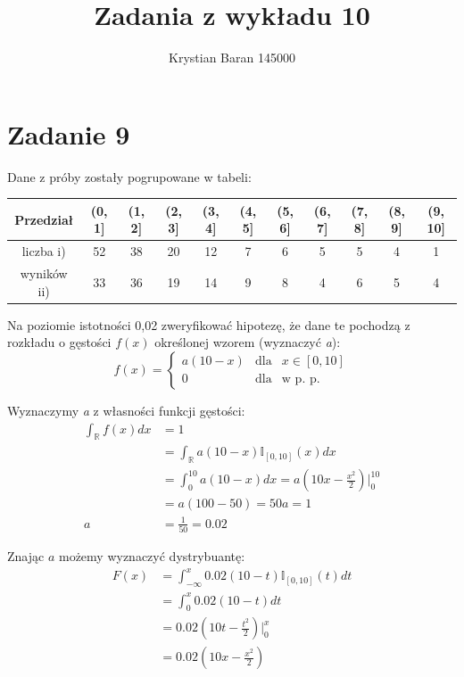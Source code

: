 \documentclass{article}
\author{Krystian Baran 145000}
\title{Zadania z wykładu 10}
\begin{document}
\maketitle
\newpage

\tableofcontents
\newpage

\section{Zadanie 9}
Dane z próby zostały pogrupowane w tabeli:
\begin{center} \begin{tabular}{|c|c|c|c|c|c|c|c|c|c|c|} \hline
Przedział & (0, 1] & (1, 2] & (2, 3] & (3, 4] & (4, 5] & (5, 6] & (6, 7] & (7, 8] & (8, 9] & (9, 10] \\ \hline
liczba i) &
52 & 38 & 20 & 12 & 7 & 6 & 5 & 5 & 4 & 1 \\ \cline{2-11}
wyników ii) & 33 & 36 & 19 & 14 & 9 & 8 & 4 & 6 & 5 & 4 \\ \hline
\end{tabular} \end{center}
Na poziomie istotności 0,02 zweryfikować hipotezę, że dane te
pochodzą z rozkładu o gęstości $f(x)$ określonej wzorem (wyznaczyć \textit{a}):
\[ f(x) = \left\{ \begin{array}{ccc} 
a(10 - x) & \text{dla} & x \in [0,10] \\
0 & \text{dla} & \text{w p. p.} 
\end{array} \right. \]

Wyznaczymy \textit{a} z własności funkcji gęstości:
\begin{align*}
\int_\mathbb{R} f(x) dx & = 1 \\
& = \int_\mathbb{R} a(10-x) \mathbb{I}_{[0,10]}(x) dx \\
& = \int_0^{10} a(10 - x) dx = a(10x - \frac{x^2}{2}) \Big\vert_0^{10} \\
& = a(100 - 50) = 50a = 1 \\
a & = \frac{1}{50} = 0.02
\end{align*}

Znając $a$ możemy wyznaczyć dystrybuantę:
\begin{align*} F(x) & = \int_{-\infty}^x 0.02(10 - t) \mathbb{I}_{[0,10]}(t) dt \\
& = \int_0^x 0.02(10 - t) dt \\
& = 0.02(10t - \frac{t^2}{2}) \Big\vert_0^x \\
& = 0.02(10x - \frac{x^2}{2})
\end{align*}
\end{document}

